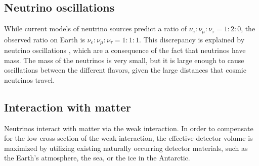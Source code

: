 \subsection{Neutrino oscillations}
While current models of neutrino sources predict a ratio of
  $\nu_e:\nu_\mu:\nu_\tau = 1:2:0$,
the observed ratio on Earth is
  $\nu_e:\nu_\mu:\nu_\tau = 1:1:1$.
This discrepancy is explained by neutrino oscillations \cite{neutrinos_beacom},
  which are a consequence of the fact that neutrinos have mass.
The mass of the neutrinos is very small,
  but it is large enough to cause oscillations between the different flavors,
  given the large distances that cosmic neutrinos travel.


\subsection{Interaction with matter}
Neutrinos interact with matter via the weak interaction.
In order to compensate for the low cross-section of the weak interaction,
  the effective detector volume is maximized by utilizing existing naturally occurring detector materials,
  such as
    the Earth's atmosphere,
    the sea,
    or the ice in the Antarctic.

